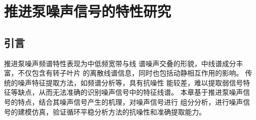 \chapter{推进泵噪声信号的特性研究}
\section{引言}
推进泵噪声频谱特性表现为中低频宽带与线
谱噪声交叠的形貌，中线谱成分丰富，不仅包含有转子叶片
的离散线谱信息，同时也包括动­静相互作用的影响。
传统的噪声特征提取方法，如频谱分析等，具有抗噪性
能较差，难以提取弱信号特征等缺点，从而无法准确的识别噪声信号中的特征线谱。
本章基于推进泵噪声信号的特点，结合其噪声信号产生的机理，对噪声信号进行
组分分析，进行噪声信号的建模仿真，验证循环平稳分析方法的抗噪性和准确提取能力。
\begin{comment}
推进泵噪声按声源类型的不同，可以将推进泵噪声分为流致噪声和振动噪声，其中流致噪声是推进泵噪声的主要贡献者。
流致噪声是由泵内非定常流动与泵相互作用产生的非定常流致激励所引起的，
前期研究发现，推进泵叶轮与其他部件之间的动静干涉是重要的流致噪声激励源。
动静干涉是指由于推进泵转子（如叶轮）和静止部件（如导叶和导管）之间的周
向不均匀流动在旋转过程中相互作用，从而导致了泵内部流道中复杂的非定常流动现象。
因此，推进泵噪声是推进泵流致激励特性的最直接的外在表现，
构建推进泵流致激励源特征提取的有效方法和途径，从噪声信号中分析出流致激励源
的影响程度以及两者的作用机理，对于推进泵低噪声设计及发展噪声能量主动控制技术至关重要。

第三章推进泵噪声试验结果显示，监测到的推进泵噪声频谱特性表现为中低频线谱噪声，中低频宽带谱噪声和
高频宽带谱噪声。
噪声信号中蕴含着丰富的流致激励源信息，但是难以从噪声信号频谱中提取出流致激励源特征信号，信号中存在复杂的干扰因素：
其一，推进泵处在复杂的背景环境声场中，背景声场中存在复杂的干扰
成分，影响测试系统对推进泵目标真实辐射噪声信号的监测；其二，推进泵结构复杂，
由于具有周期性分布的旋转、静止构件和导管，
辐射噪声的声源构件并不单一，其辐射噪声具有分量复杂性。
基于上述干扰因素，监测系统接收到的目标声场信号的
信噪比较低，特征信号如动静干涉频率、轴频等与其他背景噪声相比均较为微弱，给基于传统噪声特征提取方法带来了困难，
难以准确的获得推进泵的工作状态和结构信息，也给流致激励源特征的提取带来很大的难度。

其次，推进泵流致噪声存在显著的调制现象，上章节所研究的推进泵噪声频谱已呈现出较强的调制特性，
调制现象也是流致激励作用的结果，其中蕴含着丰富的流致激励源信息，
但是传统的频谱分析及解调方法无法实现高精度低频调制特征的提取。
因此，针对推进泵噪声信号的特点，开展对其噪声信号的分量分析研究，
基于其信号的循环平稳特性，
建立流致激励源-噪声信号模型，
探索合适的流致激励源特征提取方法，对噪声的机理分析和流致激励源特征提取有重要意义。
\end{comment}

